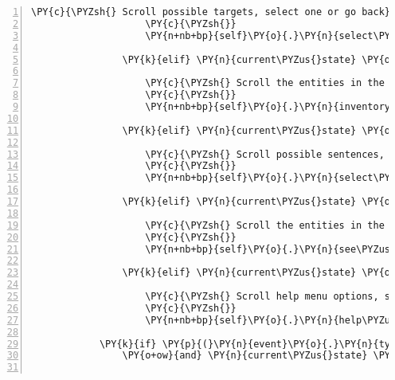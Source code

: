 \begin{Verbatim}[commandchars=\\\{\},numbers=left,firstnumber=1,stepnumber=1]
                    \PY{c}{\PYZsh{} Scroll possible targets, select one or go back}
                    \PY{c}{\PYZsh{}}
                    \PY{n+nb+bp}{self}\PY{o}{.}\PY{n}{select\PYZus{}target\PYZus{}menu}\PY{o}{.}\PY{n}{process\PYZus{}key\PYZus{}input}\PY{p}{(}\PY{n}{event}\PY{o}{.}\PY{n}{key}\PY{p}{)}

                \PY{k}{elif} \PY{n}{current\PYZus{}state} \PY{o}{==} \PY{n+nb+bp}{self}\PY{o}{.}\PY{n}{INPUT\PYZus{}STATE\PYZus{}SEE\PYZus{}RACK}\PY{p}{:}

                    \PY{c}{\PYZsh{} Scroll the entities in the rack, select one or go back}
                    \PY{c}{\PYZsh{}}
                    \PY{n+nb+bp}{self}\PY{o}{.}\PY{n}{inventory\PYZus{}menu}\PY{o}{.}\PY{n}{process\PYZus{}key\PYZus{}input}\PY{p}{(}\PY{n}{event}\PY{o}{.}\PY{n}{key}\PY{p}{)}

                \PY{k}{elif} \PY{n}{current\PYZus{}state} \PY{o}{==} \PY{n+nb+bp}{self}\PY{o}{.}\PY{n}{INPUT\PYZus{}STATE\PYZus{}CAN\PYZus{}SPEEK}\PY{p}{:}

                    \PY{c}{\PYZsh{} Scroll possible sentences, select a sentence to be spoken}
                    \PY{c}{\PYZsh{}}
                    \PY{n+nb+bp}{self}\PY{o}{.}\PY{n}{select\PYZus{}sentence\PYZus{}menu}\PY{o}{.}\PY{n}{process\PYZus{}key\PYZus{}input}\PY{p}{(}\PY{n}{event}\PY{o}{.}\PY{n}{key}\PY{p}{)}

                \PY{k}{elif} \PY{n}{current\PYZus{}state} \PY{o}{==} \PY{n+nb+bp}{self}\PY{o}{.}\PY{n}{INPUT\PYZus{}STATE\PYZus{}SEE\PYZus{}ROOM}\PY{p}{:}

                    \PY{c}{\PYZsh{} Scroll the entities in the room, select one or go back}
                    \PY{c}{\PYZsh{}}
                    \PY{n+nb+bp}{self}\PY{o}{.}\PY{n}{see\PYZus{}room\PYZus{}menu}\PY{o}{.}\PY{n}{process\PYZus{}key\PYZus{}input}\PY{p}{(}\PY{n}{event}\PY{o}{.}\PY{n}{key}\PY{p}{)}

                \PY{k}{elif} \PY{n}{current\PYZus{}state} \PY{o}{==} \PY{n+nb+bp}{self}\PY{o}{.}\PY{n}{INPUT\PYZus{}STATE\PYZus{}HELP\PYZus{}MENU}\PY{p}{:}

                    \PY{c}{\PYZsh{} Scroll help menu options, select one or go back}
                    \PY{c}{\PYZsh{}}
                    \PY{n+nb+bp}{self}\PY{o}{.}\PY{n}{help\PYZus{}menu}\PY{o}{.}\PY{n}{process\PYZus{}key\PYZus{}input}\PY{p}{(}\PY{n}{event}\PY{o}{.}\PY{n}{key}\PY{p}{)}

            \PY{k}{if} \PY{p}{(}\PY{n}{event}\PY{o}{.}\PY{n}{type} \PY{o}{==} \PY{n}{pygame}\PY{o}{.}\PY{n}{KEYDOWN}
                \PY{o+ow}{and} \PY{n}{current\PYZus{}state} \PY{o}{==} \PY{n+nb+bp}{self}\PY{o}{.}\PY{n}{INPUT\PYZus{}STATE\PYZus{}CONNECTION\PYZus{}DETAILS}\PY{p}{)}\PY{p}{:}


\end{Verbatim}
